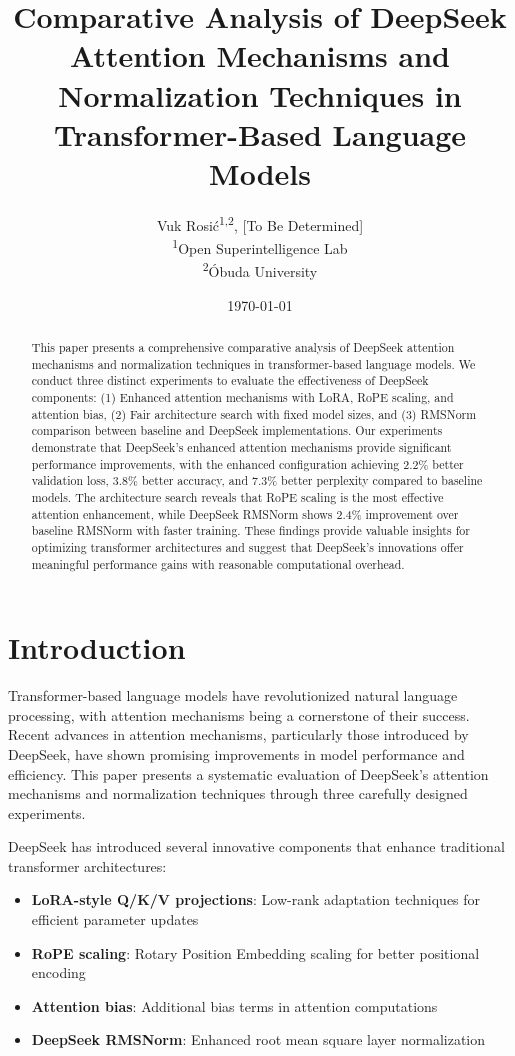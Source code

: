 \documentclass[11pt,a4paper]{article}
\title{Comparative Analysis of DeepSeek Attention Mechanisms and Normalization Techniques in Transformer-Based Language Models}
\author{
    Vuk Rosić\textsuperscript{1,2}, [To Be Determined] \\
    \textsuperscript{1}Open Superintelligence Lab \\
    \textsuperscript{2}Óbuda University
}
\date{\today}
\begin{document}
\maketitle

\begin{abstract}
This paper presents a comprehensive comparative analysis of DeepSeek attention mechanisms and normalization techniques in transformer-based language models. We conduct three distinct experiments to evaluate the effectiveness of DeepSeek components: (1) Enhanced attention mechanisms with LoRA, RoPE scaling, and attention bias, (2) Fair architecture search with fixed model sizes, and (3) RMSNorm comparison between baseline and DeepSeek implementations. Our experiments demonstrate that DeepSeek's enhanced attention mechanisms provide significant performance improvements, with the enhanced configuration achieving 2.2\% better validation loss, 3.8\% better accuracy, and 7.3\% better perplexity compared to baseline models. The architecture search reveals that RoPE scaling is the most effective attention enhancement, while DeepSeek RMSNorm shows 2.4\% improvement over baseline RMSNorm with faster training. These findings provide valuable insights for optimizing transformer architectures and suggest that DeepSeek's innovations offer meaningful performance gains with reasonable computational overhead.
\end{abstract}

\section{Introduction}

Transformer-based language models have revolutionized natural language processing, with attention mechanisms being a cornerstone of their success. Recent advances in attention mechanisms, particularly those introduced by DeepSeek, have shown promising improvements in model performance and efficiency. This paper presents a systematic evaluation of DeepSeek's attention mechanisms and normalization techniques through three carefully designed experiments.

DeepSeek has introduced several innovative components that enhance traditional transformer architectures:
\begin{itemize}
    \item \textbf{LoRA-style Q/K/V projections}: Low-rank adaptation techniques for efficient parameter updates
    \item \textbf{RoPE scaling}: Rotary Position Embedding scaling for better positional encoding
    \item \textbf{Attention bias}: Additional bias terms in attention computations
    \item \textbf{DeepSeek RMSNorm}: Enhanced root mean square layer normalization
\end{itemize}
\end{document}
